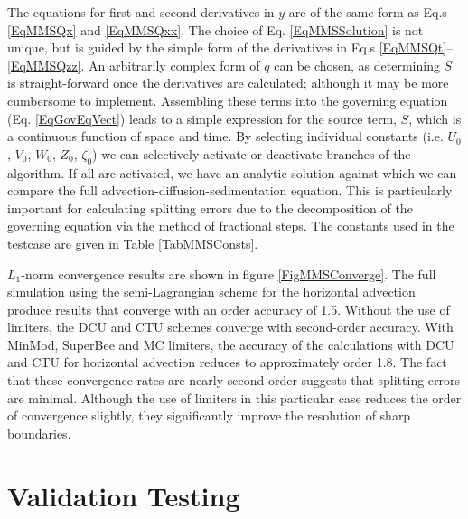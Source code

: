 The equations for first and second derivatives in $y$ are of the same form as
Eq.s \ref{EqMMSQx} and \ref{EqMMSQxx}.
The choice of Eq. \ref{EqMMSSolution} is not unique, but is guided by the simple form of
the derivatives in Eq.s \ref{EqMMSQt}--\ref{EqMMSQzz}.  An arbitrarily complex form of
$q$ can be chosen, as determining $S$ is straight-forward once the derivatives are
calculated; although it may be more cumbersome to implement. Assembling these terms into
the governing equation (Eq. \ref{EqGovEqVect}) leads to a simple expression for the source
term, $S$, which is a continuous function of space and time.  By selecting individual
constants (i.e. $U_0$, $V_0$, $W_0$, $Z_0$, $\zeta_0$) we can selectively activate or
deactivate branches of the algorithm.  If all are activated, we have an analytic solution
against which we can compare the full advection-diffusion-sedimentation equation.  This is
particularly important for calculating splitting errors due to the decomposition of the
governing equation via the method of fractional steps. The constants used in the testcase
are given in Table \ref{TabMMSConsts}.

$L_1$-norm convergence results are shown in figure \ref{FigMMSConverge}.  The full
simulation using the semi-Lagrangian scheme for the horizontal advection produce results
that converge with an order accuracy of 1.5.
Without the use of limiters, the DCU and CTU schemes converge with second-order accuracy.
With MinMod, SuperBee and MC limiters, the accuracy of the calculations with DCU and CTU
for horizontal advection reduces to approximately order 1.8.  The fact that these
convergence rates are nearly second-order suggests that splitting errors are minimal.
Although the use of limiters in this particular case reduces the order of convergence
slightly, they significantly improve the resolution of sharp boundaries.

\clearpage
\section{Validation Testing}
